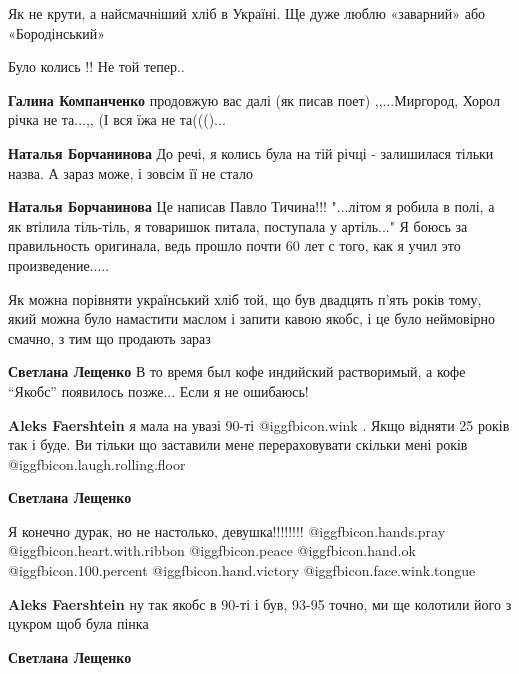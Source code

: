 \begin{itemize}
Як не крути, а найсмачніший хліб в Україні. Ще дуже люблю «заварний» або
«Бородінський»

Було колись !! Не той тепер..

\begin{itemize} %
\textbf{Галина Компанченко} продовжую вас далі (як писав поет) ,,...Миргород, Хорол річка не та...,, (І вся їжа не та((()...

\textbf{Наталья Борчанинова} До речі, я колись була на тій річці - залишилася тільки назва. А зараз може, і зовсім її не стало

\textbf{Наталья Борчанинова} Це написав Павло Тичина!!!
"...літом я робила в полі, а як втілила тіль-тіль, я товаришок питала, поступала у артіль..."
Я боюсь за правильность оригинала, ведь прошло почти 60 лет с того, как я учил это произведение.....
\end{itemize} %


Як можна порівняти український хліб той, що був двадцять п'ять років тому, який
можна було намастити маслом і запити кавою якобс, і це було неймовірно смачно,
з тим що продають зараз

\begin{itemize} %
\textbf{Светлана Лещенко} В то время был кофе индийский растворимый, а кофе \enquote{Якобс} появилось позже...
Если я не ошибаюсь!

\begin{itemize} %


\textbf{Aleks Faershtein} я мала на увазі 90-ті @igg{fbicon.wink} . Якщо відняти 25 років так і буде. Ви тільки що заставили мене перераховувати скільки мені років @igg{fbicon.laugh.rolling.floor} 

\textbf{Светлана Лещенко} 

Я конечно дурак, но не настолько, девушка!!!!!!!!
@igg{fbicon.hands.pray}  @igg{fbicon.heart.with.ribbon} @igg{fbicon.peace}
@igg{fbicon.hand.ok}  @igg{fbicon.100.percent}  @igg{fbicon.hand.victory}
@igg{fbicon.face.wink.tongue} 

\textbf{Aleks Faershtein} ну так якобс в 90-ті і був, 93-95 точно, ми ще колотили його з цукром щоб була пінка

\textbf{Светлана Лещенко} 


\end{itemize}
\end{itemize}
\end{itemize}
